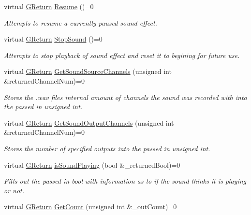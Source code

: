 \begin{DoxyCompactItemize}
virtual \mbox{\hyperlink{namespaceGW_a67a839e3df7ea8a5c5686613a7a3de21}{G\+Return}} \mbox{\hyperlink{classGW_1_1AUDIO_1_1GSound_aae7e8c6cd723ba35d67e6c0ec2c4f794}{Resume}} ()=0
\begin{DoxyCompactList}\small\item\em Attempts to resume a currently paused sound effect. \end{DoxyCompactList}\item 
virtual \mbox{\hyperlink{namespaceGW_a67a839e3df7ea8a5c5686613a7a3de21}{G\+Return}} \mbox{\hyperlink{classGW_1_1AUDIO_1_1GSound_adb9e958fc6f853a37d0d84a7fcbe806c}{Stop\+Sound}} ()=0
\begin{DoxyCompactList}\small\item\em Attempts to stop playback of sound effect and reset it to begining for future use. \end{DoxyCompactList}\item 
virtual \mbox{\hyperlink{namespaceGW_a67a839e3df7ea8a5c5686613a7a3de21}{G\+Return}} \mbox{\hyperlink{classGW_1_1AUDIO_1_1GSound_acca8a7684851e32f4022006fd9eacf6c}{Get\+Sound\+Source\+Channels}} (unsigned int \&returned\+Channel\+Num)=0
\begin{DoxyCompactList}\small\item\em Stores the .wav files internal amount of channels the sound was recorded with into the passed in unsigned int. \end{DoxyCompactList}\item 
virtual \mbox{\hyperlink{namespaceGW_a67a839e3df7ea8a5c5686613a7a3de21}{G\+Return}} \mbox{\hyperlink{classGW_1_1AUDIO_1_1GSound_a9dcb3529b8819eedfd40e865a3bc611f}{Get\+Sound\+Output\+Channels}} (unsigned int \&returned\+Channel\+Num)=0
\begin{DoxyCompactList}\small\item\em Stores the number of specified outputs into the passed in unsigned int. \end{DoxyCompactList}\item 
virtual \mbox{\hyperlink{namespaceGW_a67a839e3df7ea8a5c5686613a7a3de21}{G\+Return}} \mbox{\hyperlink{classGW_1_1AUDIO_1_1GSound_a904241837e93254806b2518f7da24ba9}{is\+Sound\+Playing}} (bool \&\+\_\+returned\+Bool)=0
\begin{DoxyCompactList}\small\item\em Fills out the passed in bool with information as to if the sound thinks it is playing or not. \end{DoxyCompactList}\item 
virtual \mbox{\hyperlink{namespaceGW_a67a839e3df7ea8a5c5686613a7a3de21}{G\+Return}} \mbox{\hyperlink{classGW_1_1AUDIO_1_1GSound_afbac022010da2fc1a917ece2803a36a4}{Get\+Count}} (unsigned int \&\+\_\+out\+Count)=0

\end{DoxyCompactItemize}
